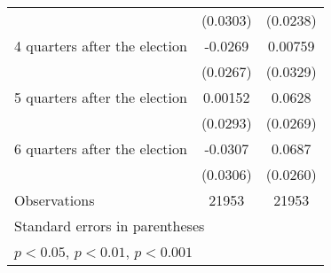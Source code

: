 \begin{table}[htbp]
\begin{tabular}{l*{2}{c}}
                    &    (0.0303)         &    (0.0238)         \\
[1em]
 4 quarters after the election&     -0.0269         &     0.00759         \\
                    &    (0.0267)         &    (0.0329)         \\
[1em]
 5 quarters after the election&     0.00152         &      0.0628\sym{*}  \\
                    &    (0.0293)         &    (0.0269)         \\
[1em]
 6 quarters after the election&     -0.0307         &      0.0687\sym{**} \\
                    &    (0.0306)         &    (0.0260)         \\
\hline
Observations        &       21953         &       21953         \\
\hline\hline
\multicolumn{3}{l}{\footnotesize Standard errors in parentheses}\\
\multicolumn{3}{l}{\footnotesize \sym{*} \(p<0.05\), \sym{**} \(p<0.01\), \sym{***} \(p<0.001\)}\\
\end{tabular}
\end{table}
